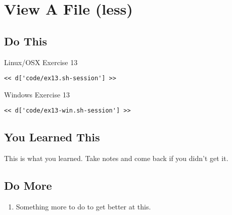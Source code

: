 \chapter{View A File (less)}

\section{Do This}

\begin{code}{Linux/OSX Exercise 13}
\begin{Verbatim}
<< d['code/ex13.sh-session'] >>
\end{Verbatim}
\end{code}

\begin{code}{Windows Exercise 13}
\begin{Verbatim}
<< d['code/ex13-win.sh-session'] >>
\end{Verbatim}
\end{code}

\section{You Learned This}

This is what you learned.  Take notes and come back if you didn't get it.

\section{Do More}

\begin{enumerate}
\item Something more to do to get better at this.
\end{enumerate}

